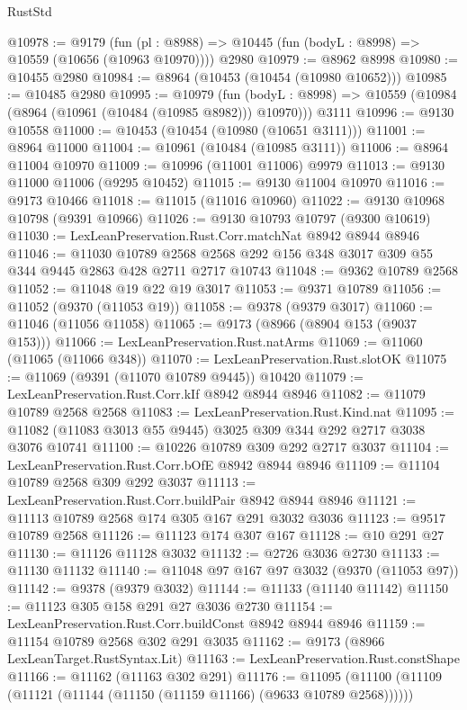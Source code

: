 \begin{lexlean}{RustStd}
\begin{coremodule}
@10978 := @9179
    (fun (pl : @8988) => @10445 (fun (bodyL : @8998) => @10559 (@10656 (@10963 @10970))))
    @2980
@10979 := @8962 @8998
@10980 := @10455 @2980
@10984 := @8964 (@10453 (@10454 (@10980 @10652)))
@10985 := @10485 @2980
@10995 := @10979
    (fun (bodyL : @8998) => @10559 (@10984 (@8964 (@10961 (@10484 (@10985 @8982))) @10970)))
    @3111
@10996 := @9130 @10558
@11000 := @10453 (@10454 (@10980 (@10651 @3111)))
@11001 := @8964 @11000
@11004 := @10961 (@10484 (@10985 @3111))
@11006 := @8964 @11004 @10970
@11009 := @10996 (@11001 @11006) @9979
@11013 := @9130 @11000 @11006 (@9295 @10452)
@11015 := @9130 @11004 @10970
@11016 := @9173 @10466
@11018 := @11015 (@11016 @10960)
@11022 := @9130 @10968 @10798 (@9391 @10966)
@11026 := @9130 @10793 @10797 (@9300 @10619)
@11030 := LexLeanPreservation.Rust.Corr.matchNat @8942 @8944 @8946
@11046 := @11030
    @10789
    @2568
    @2568
    @292
    @156
    @348
    @3017
    @309
    @55
    @344
    @9445
    @2863
    @428
    @2711
    @2717
    @10743
@11048 := @9362 @10789 @2568
@11052 := @11048 @19 @22 @19 @3017
@11053 := @9371 @10789
@11056 := @11052 (@9370 (@11053 @19))
@11058 := @9378 (@9379 @3017)
@11060 := @11046 (@11056 @11058)
@11065 := @9173 (@8966 (@8904 @153 (@9037 @153)))
@11066 := LexLeanPreservation.Rust.natArms
@11069 := @11060 (@11065 (@11066 @348))
@11070 := LexLeanPreservation.Rust.slotOK
@11075 := @11069 (@9391 (@11070 @10789 @9445)) @10420
@11079 := LexLeanPreservation.Rust.Corr.kIf @8942 @8944 @8946
@11082 := @11079 @10789 @2568 @2568
@11083 := LexLeanPreservation.Rust.Kind.nat
@11095 := @11082 (@11083 @3013 @55 @9445) @3025 @309 @344 @292 @2717 @3038 @3076 @10741
@11100 := @10226 @10789 @309 @292 @2717 @3037
@11104 := LexLeanPreservation.Rust.Corr.bOfE @8942 @8944 @8946
@11109 := @11104 @10789 @2568 @309 @292 @3037
@11113 := LexLeanPreservation.Rust.Corr.buildPair @8942 @8944 @8946
@11121 := @11113 @10789 @2568 @174 @305 @167 @291 @3032 @3036
@11123 := @9517 @10789 @2568
@11126 := @11123 @174 @307 @167
@11128 := @10 @291 @27
@11130 := @11126 @11128 @3032
@11132 := @2726 @3036 @2730
@11133 := @11130 @11132
@11140 := @11048 @97 @167 @97 @3032 (@9370 (@11053 @97))
@11142 := @9378 (@9379 @3032)
@11144 := @11133 (@11140 @11142)
@11150 := @11123 @305 @158 @291 @27 @3036 @2730
@11154 := LexLeanPreservation.Rust.Corr.buildConst @8942 @8944 @8946
@11159 := @11154 @10789 @2568 @302 @291 @3035
@11162 := @9173 (@8966 LexLeanTarget.RustSyntax.Lit)
@11163 := LexLeanPreservation.Rust.constShape
@11166 := @11162 (@11163 @302 @291)
@11176 := @11095 (@11100 (@11109 (@11121 (@11144 (@11150 (@11159 @11166) (@9633 @10789 @2568))))))

\end{coremodule}
\end{lexlean}
